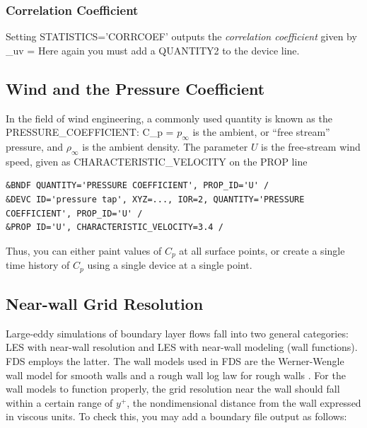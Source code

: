 \documentclass[11pt]{book}
\begin{document}
\subsubsection{Correlation Coefficient}
\label{info:corrcoef}

Setting {\ct STATISTICS='CORRCOEF'} outputs the \emph{correlation coefficient} given by
\be
   \rho_{uv} = 
\ee
Here again you must add a {\ct QUANTITY2} to the device line.

\subsection{Wind and the Pressure Coefficient}
\label{info:wind}

In the field of wind engineering, a commonly used quantity is known as
the {\ct PRESSURE\_COEFFICIENT}:
\be
   C_p = 
\ee
$p_\infty$ is the ambient, or ``free stream'' pressure, and
$\rho_\infty$ is the ambient density.  The parameter $U$ is the
free-stream wind speed, given as {\ct CHARACTERISTIC\_VELOCITY} on the
{\ct PROP} line

\begin{lstlisting}
&BNDF QUANTITY='PRESSURE COEFFICIENT', PROP_ID='U' /
&DEVC ID='pressure tap', XYZ=..., IOR=2, QUANTITY='PRESSURE COEFFICIENT', PROP_ID='U' /
&PROP ID='U', CHARACTERISTIC_VELOCITY=3.4 /
\end{lstlisting}

\noindent
Thus, you can either paint values of $C_p$ at all surface points, or create a single time history of $C_p$ using a single device at a single point.

\subsection{Near-wall Grid Resolution}
\label{info:yplus}

Large-eddy simulations of boundary layer flows fall into two general categories: LES with near-wall resolution and LES with near-wall modeling (wall functions).  FDS employs the latter.  The wall models used in FDS are the Werner-Wengle wall model \cite{Werner:1991} for smooth walls and a rough wall log law for rough walls \cite{Pope:2000}.  For the wall models to function properly, the grid resolution near the wall should fall within a certain range of $y^+$, the nondimensional distance from the wall expressed in viscous units.  To check this, you may add a boundary file output as follows:
\end{document}

